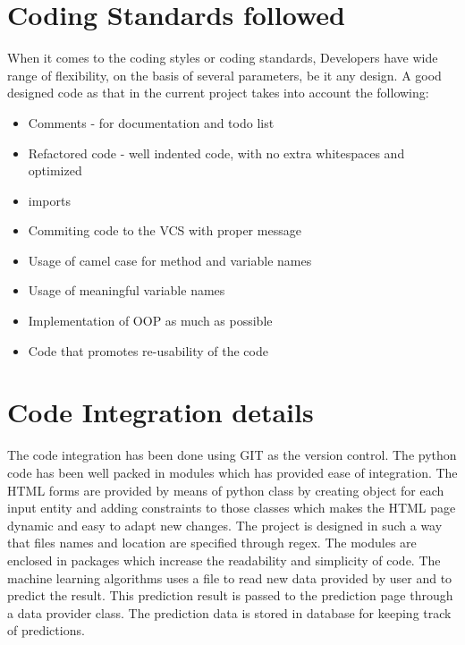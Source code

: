 \documentclass[oneside,12pt]{Classes/VTU}
\begin{document}
	\section{Coding Standards followed}
	When it comes to the coding styles or coding standards, Developers have wide range of flexibility, on the basis of several parameters, be it any design. A good designed code as that in the current project takes into account the following:
	\begin{itemize}
		\item Comments - for documentation and todo list
		\item Refactored code - well indented code, with no extra whitespaces and optimized 
		\item imports
		\item Commiting code to the VCS with proper message 
		\item Usage of camel case for method and variable names 
		\item Usage of meaningful variable names 
		\item Implementation of OOP as much as possible
		\item Code that promotes re-usability of the code 
	\end{itemize}
	
	\section{Code Integration details}
	The code integration has been done using GIT as the version control. The python code has been well packed in modules which has provided ease of integration. The HTML forms are provided by means of python class by creating object for each input entity and adding constraints to those classes which makes the HTML page dynamic and easy to adapt new changes. The project is designed in such a way that files names and location are specified through regex. The modules are enclosed in packages which increase the readability and simplicity of code. The machine learning algorithms uses a file to read new data provided by user and to predict the result. This prediction result is passed to the prediction page through a data provider class. The prediction data is stored in database for keeping track of predictions.
	
\end{document}
